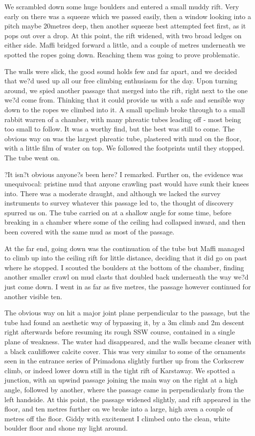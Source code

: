 \documentclass[onecolumn]{book}
\begin{document}
We scrambled down some huge boulders and entered a small muddy rift. Very early on there was a squeeze which we passed easily, then a window looking into a pitch maybe 20metres deep, then another squeeze best attempted feet first, as it pops out over a drop. At this point, the rift widened, with two broad ledges on either side. Maffi bridged forward a little, and a couple of metres underneath we spotted the ropes going down. Reaching them was going to prove problematic. 

The walls were slick, the good sound holds few and far apart, and we decided that we?d used up all our free climbing enthusiasm for the day. Upon turning around, we spied another passage that merged into the rift, right next to the one we?d come from. Thinking that it could provide us with a safe and sensible way down to the ropes we climbed into it. 
A small upclimb broke through to a small rabbit warren of a chamber, with many phreatic tubes leading off - most being too small to follow. It was a worthy find, but the best was still to come. The obvious way on was the largest phreatic tube, plastered with mud on the floor, with a little film of water on top. We followed the footprints until they stopped. The tube went on.

?It isn?t obvious anyone?s been here? I remarked. Further on, the evidence was unequivocal: pristine mud that anyone crawling past would have sunk their knees into. There was a moderate draught, and although we lacked the survey instruments to survey whatever this passage led to, the thought of discovery spurred us on. The tube carried on at a shallow angle for some time, before breaking in a chamber where some of the ceiling had collapsed inward, and then been covered with the same mud as most of the passage. 

At the far end, going down was the continuation of the tube but Maffi managed to climb up into the ceiling rift for little distance, deciding that it did go on past where he stopped. I scouted the boulders at the bottom of the chamber, finding another smaller crawl on mud clasts that doubled back underneath the way we?d just come down. I went in as far as five metres, the passage however continued for another visible ten.

The obvious way on hit a major joint plane perpendicular to the passage, but the tube had found an aesthetic way of bypassing it, by a 3m climb and 2m descent right afterwards before resuming its rough SSW course, contained in a single plane of weakness. The water had disappeared, and the walls became cleaner with a black cauliflower calcite cover. This was very similar to some of the ornaments seen in the entrance series of Primadona slightly further up from the Corkscrew climb, or indeed lower down still in the tight rift of Karstaway.
We spotted a junction, with an upwind passage joining the main way on the right at a high angle, followed by another, where the passage came in perpendicularly from the left handside. At this point, the passage widened slightly, and rift appeared in the floor, and ten metres further on we broke into a large, high aven a couple of metres off the floor. Giddy with excitement I climbed onto the clean, white boulder floor and shone my light around. 
\end{document}
